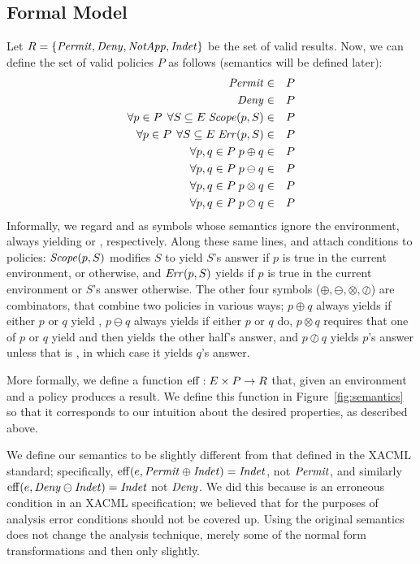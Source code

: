 \subsection{Formal Model}
\label{sec:formal-model}

Let $R = \{ \text{\textit{Permit}}, \text{\textit{Deny}}, \text{\textit{NotApp}}, \text{\textit{Indet}} \}$ be the set
of valid results.  Now, we can define the set of valid policies $P$ as
follows (semantics will be defined later):
\begin{eqnarray*}
  \text{\textit{Permit}} & \in & P \\
  \text{\textit{Deny}} & \in & P \\
  \forall p \in P \;\, \forall S \subseteq E \; \text{\textit{Scope}} (p, S) & \in & P \\
  \forall p \in P \;\, \forall S \subseteq E \; \text{\textit{Err}} (p, S) & \in & P \\
  \forall p, q \in P \; p \oplus q & \in & P \\
  \forall p, q \in P \; p \ominus q & \in & P \\
  \forall p, q \in P \; p \otimes q & \in & P \\
  \forall p, q \in P \; p \oslash q & \in & P
\end{eqnarray*}
Informally, we regard \Permit{} and \Deny{} as symbols whose semantics
ignore the environment, always yielding \Permit{} or \Deny{},
respectively.  Along these same lines, \Scope{} and \Err{} attach
conditions to policies: $\text{\textit{Scope}} (p, S)$ modifies $S$ to yield $S$'s
answer if $p$ is true in the current environment, or \NotApplicable{}
otherwise, and $\text{\textit{Err}} (p, S)$ yields \Indeterminate{} if $p$ is true in
the current environment or $S$'s answer otherwise.  The other four
symbols ($\oplus, \ominus, \otimes, \oslash$) are combinators, that
combine two policies in various ways; $p \oplus q$ always yields
\Permit{} if either $p$ or $q$ yield \Permit{}, $p \ominus q$ always
yields \Deny{} if either $p$ or $q$ do, $p \otimes q$ requires that
one of $p$ or $q$ yield \NotApplicable{} and then yields the other
half's answer, and $p \oslash q$ yields $p$'s answer unless that is
\NotApplicable{}, in which case it yields $q$'s answer.

More formally, we define a function $\operatorname{eff} : E \times P \rightarrow R$
that, given an environment and a policy produces a result.  We define
this function in Figure~\ref{fig:semantics} so that it corresponds to
our intuition about the desired properties, as described above.

We define our semantics to be slightly different from that defined in
the XACML standard; specifically, $\operatorname{eff}(e, \text{\textit{Permit}} \oplus
\text{\textit{Indet}}) = \text{\textit{Indet}}$, not $\text{\textit{Permit}}$, and similarly
$\operatorname{eff}(e, \text{\textit{Deny}} \ominus \text{\textit{Indet}}) = \text{\textit{Indet}}$ not $\text{\textit{Deny}}$.
We did this because \Indeterminate{} is an erroneous condition in an
XACML specification; we believed that for the purposes of analysis
error conditions should not be covered up.  Using the original
semantics does not change the analysis technique, merely some of the
normal form transformations and then only slightly.

